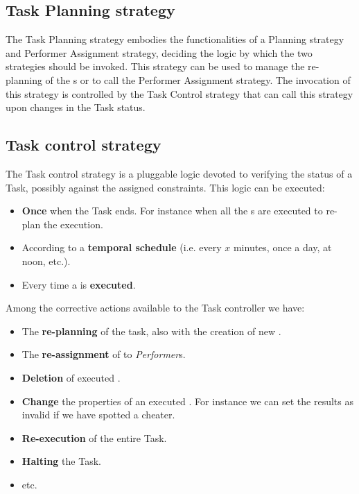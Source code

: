 \subsection{Task Planning strategy}
The Task Planning strategy embodies the functionalities of a \utask{} Planning
strategy and Performer Assignment strategy, deciding the logic by which the
two strategies should be invoked. This strategy can be used to manage the
re-planning of the \utask{}s or to call the Performer Assignment strategy. The
invocation of this strategy is controlled by the Task Control strategy that can
call this strategy upon changes in the Task status.




\subsection{Task control strategy}
The Task control strategy is a pluggable logic devoted to verifying the status of
a Task, possibly against the assigned constraints. This logic can be executed:
\begin{itemize}
    \item \textbf{Once} when the Task ends. For instance when all the \utask{}s
    are executed to re-plan the execution.

    \item According to a \textbf{temporal schedule} (i.e. every $x$ minutes,
    once a day, at noon, etc.).

    \item Every time a \utask{} is \textbf{executed}.
\end{itemize}
\noindent Among the corrective actions available to the Task controller we have: 
\begin{itemize}
    \item The \textbf{re-planning} of the task, also with the creation of new
    \utask{}.

    \item The \textbf{re-assignment} of \utask{} to \emph{Performer}s.

    \item \textbf{Deletion} of executed \utask{}.

    \item \textbf{Change} the properties of an executed \utask{}. For instance
    we can set the results as invalid if we have spotted a cheater.

    \item \textbf{Re-execution} of the entire Task.

    \item \textbf{Halting} the Task.

    \item etc.
\end{itemize}



